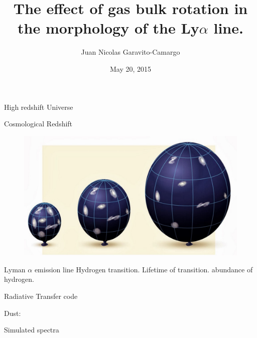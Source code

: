 \documentclass{beamer}
\title[Make a LaTeX presentation using Beamer]{The effect of gas bulk 
rotation in the morphology of the Ly$\alpha$ line.}
\author{Juan Nicolas Garavito-Camargo}
\institute{Universidad de los Andes, Bogot\'a, Colombia}
\date{May 20, 2015}
\begin{document}
\begin{frame}
\titlepage
\author
\institute
\end{frame}

\begin{frame}
High redshift Universe
\end{frame}

\begin{frame}{Cosmological Redshift}
\begin{figure}
\includegraphics[scale=0.3]{Figures/universe-expansion.jpg}
\end{figure}
\end{frame}


\begin{frame}{Lyman $\alpha$ emission line}
Hydrogen transition.  Lifetime of transition. abundance of hydrogen.
\end{frame}


\begin{frame}{Radiative Transfer code}

\end{frame}


\begin{frame}{Dust:}

\end{frame}

\begin{frame}{Simulated spectra}

\end{frame}
\end{document}
